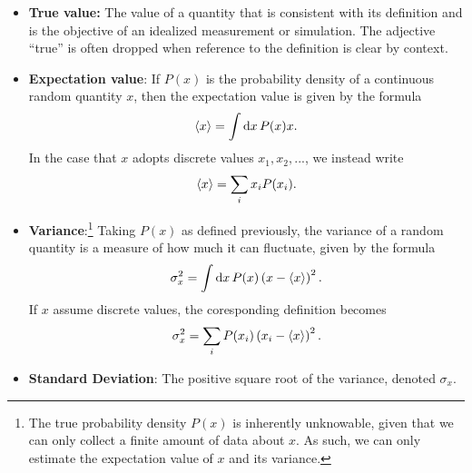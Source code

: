 \begin{itemize}
\item {\bf True value:}  The value of a quantity that is consistent with its definition and is the objective of an idealized measurement or simulation. The adjective ``true'' is often dropped when reference to the definition is clear by context\citep{JCGM:GUM2008,JCGM:VIM2012}.
  \label{def:true_value}



\item {\bf Expectation value}:  If $P(x)$ is the probability density of a continuous random quantity $x$, then the expectation value is given by the formula
\begin{align}
  \langle x \rangle = \int {\rm d}x\, P(x) x.
\end{align}
In the case that $x$ adopts discrete values $x_1,x_2,...$, we instead write
\begin{align}
  \langle x \rangle = \sum_i x_i P(x_i).
\end{align}

\item {\bf Variance}:\footnote{The true probability density $P(x)$ is inherently unknowable, given that we can only collect a finite amount of data about $x$.  As such, we can only estimate the expectation value of $x$ and its variance.} Taking $P(x)$ as defined previously, the variance of a random quantity is a measure of how much it can fluctuate, given by the formula
\begin{align}
\sigma_x^2 = \int {\rm d}x\, P(x) \left( x  - \langle x \rangle \right)^2.
\end{align}
If $x$ assume discrete values, the coresponding definition becomes
\begin{align}
\sigma_x^2 = \sum_i P(x_i) \left( x_i  - \langle x \rangle \right)^2.
\end{align}

\item {\bf Standard Deviation}: The positive square root of the variance, denoted $\sigma_x$.\label{def:st_dev}


\end{itemize}

